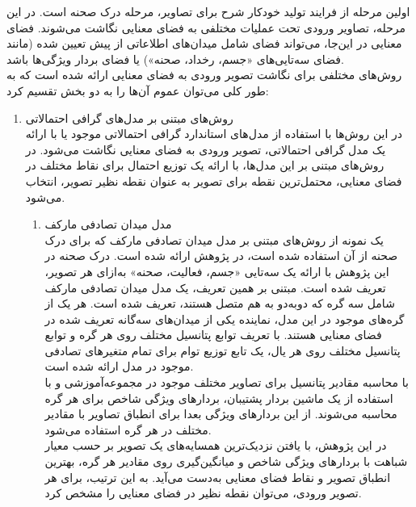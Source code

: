 اولین مرحله از فرایند تولید خودکار شرح برای تصاویر، مرحله درک صحنه است. در این مرحله، تصاویر ورودی تحت عملیات مختلفی به فضای معنایی نگاشت می‌شوند. فضای معنایی در این‌جا، می‌تواند فضای شامل میدان‌های اطلاعاتی از پیش تعیین شده (مانند فضای سه‌تایی‌های «جسم، رخداد، صحنه») یا فضای بردار ویژگی‌ها باشد.
\\
روش‌های مختلفی برای نگاشت تصویر ورودی به فضای معنایی ارائه شده است که به طور کلی می‌توان عموم آن‌ها را به دو بخش تقسیم کرد:
\begin{enumerate}
\item
روش‌های مبتنی بر مدل‌های گرافی احتمالاتی\\
در این روش‌ها با استفاده از مدل‌های استاندارد گرافی احتمالاتی موجود یا با ارائه یک مدل گرافی احتمالاتی، تصویر ورودی به فضای معنایی نگاشت می‌شود. در روش‌های مبتنی بر این مدل‌ها، با ارائه یک توزیع احتمال برای نقاط مختلف در فضای معنایی، محتمل‌ترین نقطه برای تصویر به عنوان نقطه نظیر تصویر، انتخاب می‌شود.
\\
	\begin{enumerate}
		\item مدل میدان تصادفی مارکف\\

یک نمونه از روش‌های مبتنی بر مدل میدان تصادفی مارکف که برای درک صحنه از آن استفاده شده است، در پژوهش\cite{Farhadi2010every} 
ارائه شده است. درک صحنه در این پژوهش با ارائه یک سه‌تایی «جسم، فعالیت، صحنه» به‌ازای هر تصویر، تعریف شده است. مبتنی بر همین تعریف، یک مدل میدان تصادفی مارکف شامل سه گره که دو‌به‌دو به هم متصل هستند، تعریف شده است. هر یک از گره‌های موجود در این مدل، نماینده یکی از میدان‌های سه‌گانه تعریف شده در فضای معنایی هستند. با تعریف توابع پتانسیل مختلف روی هر گره و توابع پتانسیل مختلف روی هر یال، یک تابع توزیع توام برای تمام متغیرهای تصادفی موجود در مدل ارائه شده است.
\\
با محاسبه مقادیر پتانسیل برای تصاویر مختلف موجود در مجموعه‌آموزشی و با استفاده از یک ماشین بردار پشتیبان، بردارهای ویژگی شاخص برای هر گره محاسبه می‌شوند. از این بردارهای ویژگی بعدا برای انطباق تصاویر با مقادیر مختلف در هر گره استفاده می‌شود.
\\
در این پژوهش،‌ با یافتن نزدیک‌ترین همسایه‌های یک تصویر بر حسب معیار شباهت با بردارهای ویژگی شاخص  و میانگین‌گیری روی مقادیر هر گره، بهترین انطباق تصویر و نقاط فضای معنایی به‌دست می‌آید. به این ترتیب، برای هر تصویر ورودی، می‌توان نقطه نظیر در فضای معنایی را مشخص کرد.
		

\end{enumerate}
\end{enumerate}
